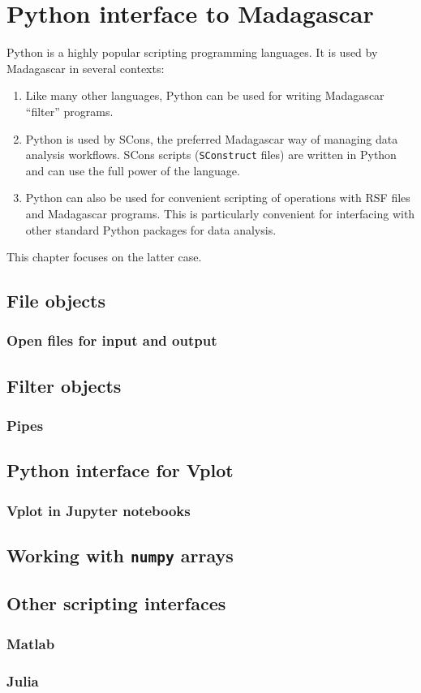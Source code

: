 \chapter{Python interface to Madagascar}

Python is a highly popular scripting programming languages. It is used by Madagascar in several contexts:
\begin{enumerate}
\item Like many other languages, Python can be used for writing Madagascar ``filter'' programs.
\item Python is used by SCons, the preferred Madagascar way of
  managing data analysis workflows. SCons scripts (\texttt{SConstruct}
  files) are written in Python and can use the full power of the
  language.
\item Python can also be used for convenient scripting of operations
  with RSF files and Madagascar programs. This is particularly
  convenient for interfacing with other standard Python packages for
  data analysis.
\end{enumerate}
This chapter focuses on the latter case.

\section{File objects}

\subsection{Open files for input and output}

\section{Filter objects}

\subsection{Pipes}

\section{Python interface for Vplot}

\subsection{Vplot in Jupyter notebooks}

\section{Working with \texttt{numpy} arrays}

\section{Other scripting interfaces}

\subsection{Matlab}

\subsection{Julia}
